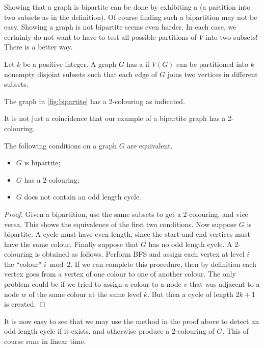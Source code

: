 Showing that a graph is bipartite can be done by exhibiting a
 (a partition into two subsets as in the
definition). Of course finding such a bipartition may not be easy. Showing
a graph is not bipartite seems even harder. In each case, we certainly
do not want to have to test all possible partitions of $V$ into two
subsets! There is a better way.

\begin{Definition}
Let $k$ be a positive integer. A graph $G$ has a 
if $V(G)$ can be partitioned into $k$ nonempty disjoint subsets such
that each edge of $G$ joins two vertices in different subsets.
\end{Definition}

\begin{Example}
The graph in \cref{fig:bipartite} has a 2-colouring as indicated.
\end{Example}

It is not just a coincidence that our example of a bipartite graph
has a 2-colouring.

\begin{Theorem} 
The following conditions on a graph $G$ are equivalent.
\begin{itemize}
\item
$G$ is bipartite;
\item
$G$ has a $2$-colouring;
\item
$G$ does not contain an odd length cycle.
\end{itemize}
\end{Theorem}

\begin{proof} 
Given a bipartition, use the same subsets to get a $2$-colouring, and
vice versa. This shows the equivalence of the first two conditions. Now
suppose $G$ is bipartite.  A cycle must have even length, since the start
and end vertices must have the same colour. Finally suppose that $G$
has no odd length cycle. A $2$-colouring is obtained as follows. Perform
BFS and assign each vertex at level $i$ the ``colour" $i \bmod 2$. If we
can complete this procedure, then by definition each vertex goes from
a vertex of one colour to one of another colour. The only problem could
be if we tried to assign a colour to a node $v$ that was adjacent to a
node $w$ of the same colour at the same level $k$. But then a cycle of
length $2k+1$ is created.
\end{proof}

It is now easy to see that we may use the method in the proof above
to detect an odd length cycle if it exists, and otherwise produce a
$2$-colouring of $G$. This of course runs in linear time.

